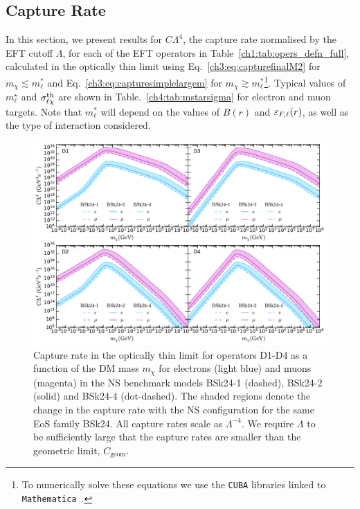 \subsection{Capture Rate}
\label{ch4:subsec:caprateresults}

In this section, we present results for $C\Lambda^4$, the capture rate normalised by the EFT cutoff $\Lambda$, for each of the EFT operators in Table~\ref{ch1:tab:opers_defn_full}, calculated in the optically thin limit using Eq.~\ref{ch3:eq:capturefinalM2} for $m_\chi\lesssim m_\ell^*$ and  Eq.~\ref{ch3:eq:capturesimplelargem} for $m_\chi\gtrsim m_\ell^*$\footnote{To numerically solve these equations we use the \texttt{CUBA} libraries \cite{Hahn:2004fe_CUBALibrarymultidimensional, Hahn:2014fua_Concurrentcuba} linked to \texttt{Mathematica}~\cite{Mathematica}.}. Typical values of $m_\ell^\star$ and $\sigma^{\rm th}_{\ell\chi}$ are shown in Table.~\ref{ch4:tab:mstarsigma} for electron and muon targets. Note that $m_\ell^*$ will depend on the values of $B(r)$ and $\varepsilon_{F,\ell}(r)$, as well as the type of interaction considered. 

\begin{figure}[t] 
    \centering
    \includegraphics[width=\textwidth]{capture_2/D1_D4_C_mDM_lept.pdf}
    \caption[Capture rate in the optically thin limit for operators D1-D4 as a function of the DM mass $m_\chi$ for electrons (light blue) and muons (magenta) in the NS benchmark models BSk24-1 (dashed), BSk24-2 (solid) and BSk24-4 (dot-dashed).]{Capture rate in the optically thin limit for operators D1-D4 as a function of the DM mass $m_\chi$ for electrons (light blue) and muons (magenta) in the NS benchmark models BSk24-1 (dashed), BSk24-2 (solid) and BSk24-4 (dot-dashed). The shaded regions denote the change in the capture rate with the NS configuration for the same EoS family BSk24. 
    All capture rates scale as $\Lambda^{-4}$. We require $\Lambda$ to be sufficiently large that the capture rates are smaller than the geometric limit, $C_\mathrm{geom}$. 
    }
    \label{ch4:fig:capratesD1D4}
    \end{figure} 
    
